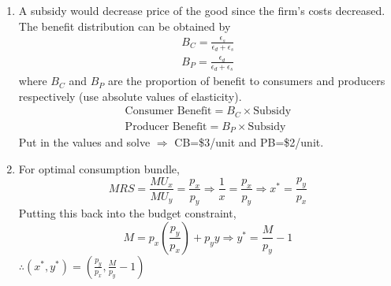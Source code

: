 \documentclass{article}
\begin{document}
\begin{enumerate}
\begin{itemize}
            \item Producer Surplus = \(\frac{1}{2}\) $\times$ (90-0) $\times$ (45-0) = 2025 \\
            \item Deadweight Loss = 0 
        \end{itemize}
        Now market is monopolistic, producing at the quantity where $MC=MR$ i.e Q=30 and charging a price of P=120.
        \begin{itemize}
            \item Consumer Surplus = \(\frac{1}{2}\) $\times$ (180-120) $\times$ (30-0) = 900 \\
            \item Producer Surplus = \(\frac{1}{2}\) $\times$ [(120-0)+(120-60)] $\times$ (30-0) = 2700 \\
            \item Deadweight Loss = \(\frac{1}{2}\) $\times$ (120-60) $\times$ (45-30) = 450 
        \end{itemize}
        $\therefore \Delta CS=-1125$ , $\Delta PS=675$ , $\Delta DWL= 450$
    \item 
        A subsidy would decrease price of the good since the firm's costs decreased. The benefit distribution can be obtained by 
        \begin{align*}
            B_C = \frac{\epsilon_s}{\epsilon_d + \epsilon_s} \\
            B_P = \frac{\epsilon_d}{\epsilon_d + \epsilon_s}
        \end{align*}
        where $B_C$ and $B_P$ are the proportion of benefit to consumers and producers respectively (use absolute values of elasticity).
        \begin{align*}
            \text{Consumer Benefit} = B_C \times \text{Subsidy} \\
            \text{Producer Benefit} = B_P \times \text{Subsidy}
        \end{align*}
        Put in the values and solve $\Rightarrow$ CB=\$3/unit and PB=\$2/unit.
    \item 
        For optimal consumption bundle, 
        \[
        MRS=\frac{MU_x}{MU_y} = \frac{p_x}{p_y} \Rightarrow \frac{1}{x} = \frac{p_x}{p_y} \Rightarrow x^* = \frac{p_y}{p_x}
        \]
        Putting this back into the budget constraint, 
        \[
        M=p_x(\frac{p_y}{p_x}) + p_yy \Rightarrow y^* = \frac{M}{p_y} - 1
        \]
        $\therefore (x^*,y^*) = (\frac{p_y}{p_x},\frac{M}{p_y} -1)$ \\

\end{enumerate}
\end{document}
